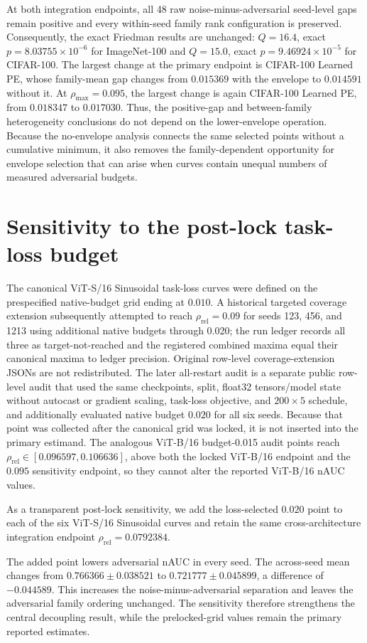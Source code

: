 \documentclass[preprint,12pt,authoryear]{elsarticle}
\begin{document}
At both integration endpoints, all 48 raw noise-minus-adversarial
seed-level gaps remain positive and every within-seed family rank
configuration is preserved. Consequently, the exact Friedman results are
unchanged: $Q=16.4$, exact $p=8.03755\times10^{-6}$ for ImageNet-100 and
$Q=15.0$, exact $p=9.46924\times10^{-5}$ for CIFAR-100. The largest change
at the primary endpoint is CIFAR-100 Learned PE, whose family-mean gap
changes from $0.015369$ with the envelope to $0.014591$ without it. At
$\rho_{\max}=0.095$, the largest change is again CIFAR-100 Learned PE,
from $0.018347$ to $0.017030$. Thus, the positive-gap and between-family
heterogeneity conclusions do not depend on the lower-envelope operation.
Because the no-envelope analysis connects the same selected points without a
cumulative minimum, it also removes the family-dependent opportunity for
envelope selection that can arise when curves contain unequal numbers of
measured adversarial budgets.


\section{Sensitivity to the post-lock task-loss budget}
\label{sec:s-postlock-grid}

The canonical ViT-S/16 Sinusoidal task-loss curves were defined on the
prespecified native-budget grid ending at $0.010$. A historical targeted
coverage extension subsequently attempted to reach $\rho_{\mathrm{rel}}=0.09$
for seeds 123, 456, and 1213 using additional native budgets through 0.020; the
run ledger records all three as target-not-reached and the registered combined
maxima equal their canonical maxima to ledger precision. Original row-level
coverage-extension JSONs are not redistributed. The later all-restart audit is
a separate public row-level audit that used the same checkpoints, split,
float32 tensors/model state without autocast or gradient scaling, task-loss
objective, and $200\times5$ schedule, and additionally evaluated native budget
$0.020$ for all six seeds. Because that point was collected after the canonical
grid was locked, it is not inserted into the primary estimand. The analogous
ViT-B/16 budget-0.015 audit points reach
$\rho_{\mathrm{rel}}\in[0.096597,0.106636]$, above both the locked
ViT-B/16 endpoint and the $0.095$ sensitivity endpoint, so they cannot alter
the reported ViT-B/16 nAUC values.

As a transparent post-lock sensitivity, we add the loss-selected $0.020$
point to each of the six ViT-S/16 Sinusoidal curves and retain the same
cross-architecture integration endpoint
$\rho_{\mathrm{rel}}=0.0792384$.



The added point lowers adversarial nAUC in every seed. The across-seed mean
changes from $0.766366\pm0.038521$ to
$0.721777\pm0.045899$, a difference of $-0.044589$. This increases the
noise-minus-adversarial separation and leaves the adversarial family
ordering unchanged. The sensitivity therefore strengthens the central
decoupling result, while the prelocked-grid values remain the primary
reported estimates.
\end{document}
